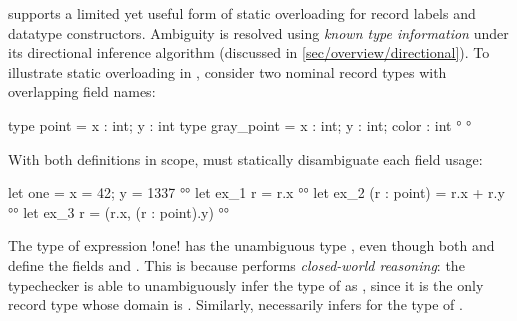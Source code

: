 \documentclass[acmsmall,screen,nonacm%
\Anonymous{,anonymous}{}%
\Final{}{,review}%
]{acmart}
\providecommand{\DIFadd}[1]{\protect\cbstart{\protect\color{blue}#1}\protect\cbend} %
\providecommand{\DIFdel}[1]{\protect\cbdelete{\protect\color{red}#1}\protect\cbdelete} %
\providecommand{\DIFaddbegin}{} %
\providecommand{\DIFaddend}{} %
\providecommand{\DIFdelbegin}{} %
\providecommand{\DIFdelend}{} %
\begin{document}
\OCaml supports a limited yet useful form of static overloading for record
labels and datatype constructors. Ambiguity is resolved using \emph{known
type information} under its directional inference algorithm (discussed in
\cref{sec/overview/directional}).
%
To illustrate static overloading in \OCaml, consider two nominal
record types with overlapping field names:
\begin{program}[input]
type point      = { x : int; y : int }
type gray_point = { x : int; y : int; color : int } °
°
\end{program}
With both definitions in scope, \OCaml must statically disambiguate each
field usage:
\begin{program}
let one = { x = 42; y = 1337 }                           °°
let ex_1 r = r.x                                         °°
let ex_2 (r : point) = r.x + r.y                         °°
let ex_3 r = (r.x, (r : point).y)                        °°
\end{program}
%
The type of expression \ocaml!one! has the unambiguous type ,
even though both  and  define the fields
 and .
This is because \OCaml performs \emph{closed-world reasoning}: the
typechecker is able to unambiguously
infer the type of  as , since it is the only record type
whose domain is \DIFdelbegin %
\DIFdel{!$\{$ x, y $\}$!}\DIFdelend \DIFaddbegin \DIFadd{$\set{\mathtt{x}, \mathtt{y}}$}\DIFaddend . Similarly,
 necessarily infers  for the type of .

\end{document}
